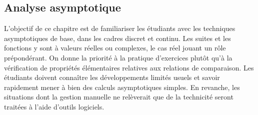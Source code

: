 \subsection{Analyse asymptotique}
\begin{itshape}
 L’objectif de ce chapitre est de familiariser les étudiants avec les techniques asymptotiques de base, dans les cadres discret
et continu. Les suites et les fonctions y sont à valeurs réelles ou complexes, le cas réel jouant un rôle prépondérant.\newline
On donne la priorité à la pratique d’exercices plutôt qu’à la vérification de propriétés élémentaires relatives aux relations
de comparaison.\newline
Les étudiants doivent connaître les développements limités usuels et savoir rapidement mener à bien des calculs asymptotiques simples. En revanche, les situations dont la gestion manuelle ne relèverait que de la technicité seront traitées à
l’aide d’outils logiciels.
\end{itshape}

\begin{parcolumns}[rulebetween,distance=\parcoldist]{2}
  \colplacechunks
  
  \colplacechunks

  \colchunk{}
  \colplacechunks

  \colchunk{}
  \colplacechunks
\end{parcolumns}


\begin{parcolumns}[rulebetween,distance=\parcoldist]{2}
  \colchunk{}
  \colplacechunks
\end{parcolumns}


